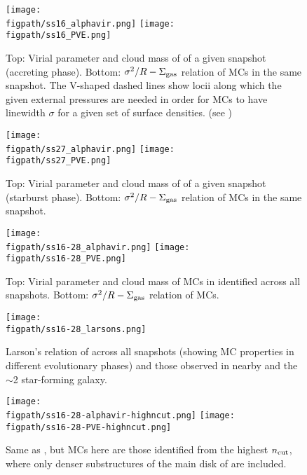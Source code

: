 \documentclass[iop]{emulateapj} %
\begin{document}
\begin{figure*}[htbp]
\centering
\texttt{[image: \\figpath/ss16\_alphavir.png]}
\texttt{[image: \\figpath/ss16\_PVE.png]}
\caption{
Top: Virial parameter and cloud mass of \flower of a given snapshot (accreting phase).
Bottom: $\sigma^2/R - \Sigma_{\rm gas}$ relation of MCs in the same snapshot.
The V-shaped dashed lines show locii along which the given external pressures
are needed in order for MCs to have linewidth $\sigma$ for a given set of surface densities. (see )
\label{fig:alpha16}}
\end{figure*}


\begin{figure*}[htbp]
\centering
\texttt{[image: \\figpath/ss27\_alphavir.png]}
\texttt{[image: \\figpath/ss27\_PVE.png]}
\caption{
Top: Virial parameter and cloud mass of \flower of a given snapshot (starburst phase).
Bottom: $\sigma^2/R - \Sigma_{\rm gas}$ relation of MCs in the same snapshot.
\label{fig:alpha27}}
\end{figure*}






\begin{figure*}[htbp]
\centering
\texttt{[image: \\figpath/ss16-28\_alphavir.png]}
\texttt{[image: \\figpath/ss16-28\_PVE.png]}
\caption{
Top: Virial parameter and cloud mass of MCs in \flower identified across all snapshots.
Bottom: $\sigma^2/R - \Sigma_{\rm gas}$ relation of MCs.
\label{fig:alpha16-28}}
\end{figure*}

\begin{figure*}[htbp]
\centering
\texttt{[image: \\figpath/ss16-28\_larsons.png]}
\caption{
Larson's relation of \flower across all snapshots (showing MC properties in different evolutionary
phases) and
those observed in nearby and the \z$\sim$2 star-forming galaxy.
\label{fig:larsons16-28}}
\end{figure*}


\begin{figure*}[htbp]
\centering
\texttt{[image: \\figpath/ss16-28-alphavir-highncut.png]}
\texttt{[image: \\figpath/ss16-28-PVE-highncut.png]}
\caption{
Same as , but MCs here are those identified from the highest $n_{\rm cut}$,
where only denser substructures of the main disk of \flower are included.
\label{fig:alpha16-28-highncut}}
\end{figure*}
\end{document}

